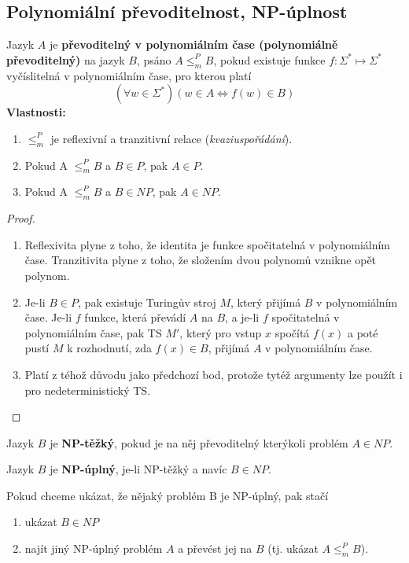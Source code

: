 \documentclass[11pt]{report} %
\numberwithin{equation}{section}
\begin{document}
\subsection{Polynomiální převoditelnost, NP-úplnost}
Jazyk $A$ je \textbf{převoditelný v polynomiálním čase (polynomiálně převoditelný)} na jazyk $B$, psáno $A \leq_m^P B$, pokud existuje funkce $f : \Sigma^* \mapsto \Sigma^*$ vyčíslitelná v polynomiálním čase, pro kterou platí
$$(\forall w \in \Sigma^*) (w \in A \Leftrightarrow f(w) \in B)$$
\textbf{Vlastnosti:}
\begin{enumerate}
	
	
	\item $\leq_m^P$ je reflexivní a tranzitivní relace (\textit{kvaziuspořádání}).
	\item Pokud A $\leq_m^P B$ a $B \in P$, pak $A \in P$.
	\item Pokud A $\leq_m^P B$ a $B \in NP$, pak $A \in NP$.
\end{enumerate}
\begin{proof}~
	\begin{enumerate}
		
		
		\item Reflexivita plyne z toho, že identita je funkce spočitatelná v polynomiálním čase. Tranzitivita plyne z toho, že složením dvou polynomů vznikne opět polynom.
		\item Je-li $B \in P$, pak existuje Turingův stroj $M$, který přijímá $B$ v polynomiálním čase. Je-li $f$ funkce, která převádí $A$ na $B$, a je-li $f$ spočitatelná v polynomiálním čase, pak TS $M'$, který pro vstup $x$ spočítá $f(x)$ a poté pustí $M$ k rozhodnutí, zda $f(x) \in B$, přijímá $A$ v polynomiálním čase.
		\item Platí z téhož důvodu jako předchozí bod, protože tytéž argumenty lze použít i pro nedeterministický TS.
	\end{enumerate}
\end{proof}

Jazyk $B$ je \textbf{NP-těžký}, pokud je na něj převoditelný kterýkoli problém $A \in NP$.

Jazyk $B$ je \textbf{NP-úplný}, je-li NP-těžký a navíc $B \in NP$.

Pokud chceme ukázat, že nějaký problém B je NP-úplný, pak stačí
\begin{enumerate}


	\item ukázat $B \in NP$
	\item najít jiný NP-úplný problém $A$ a převést jej na $B$ (tj. ukázat $A \leq_m^P B$).
\end{enumerate}
\end{document}

